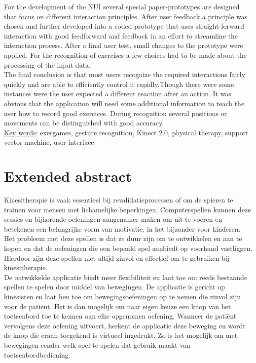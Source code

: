 For the development of the NUI several special paper-prototypes are designed that focus on different interaction principles. After user feedback a principle was chosen and further developed into a coded prototype that uses straight-forward interaction with good feedforward and feedback in an effort to streamline the interaction process. After a final user test, small changes to the prototype were applied. For the recognition of exercises a few choices had to be made about the processing of the input data.\\


The final conclusion is that most users recognize the required interactions fairly quickly and are able to efficiently control it rapidly.Though there were some instances were the user expected a different reaction after an action. It was obvious that the application will need some additional information to teach the user how to record good exercices. During recognition several positions or movements can be distinguished with good accuracy. \\


\underline{Key words}: exergames, gesture recognition, Kinect 2.0, physical therapy, support vector machine, user interface


\chapter*{Extended abstract}

Kinesitherapie is vaak essentieel bij revalidatieprocessen of om de spieren te trainen voor mensen met lichamelijke beperkingen. Computerspellen kunnen deze sessies en bijhorende oefeningen aangenamer maken om uit te voeren en betekenen een belangrijke vorm van motivatie, in het bijzonder voor kinderen. Het probleem met deze spellen is dat ze duur zijn om te ontwikkelen en aan te kopen en dat de oefeningen die een bepaald spel aanbiedt op voorhand vastliggen. Hierdoor zijn deze spellen niet altijd zinvol en effectief om te gebruiken bij kinesitherapie.\\

De ontwikkelde applicatie biedt meer flexibiliteit en laat toe om reeds bestaande spellen te spelen door middel van bewegingen. De applicatie is gericht op kinesisten en laat hen toe om bewegingsoefeningen op te nemen die zinvol zijn voor de pati\"ent. Het is dan mogelijk om naar eigen keuze een knop van het toetsenbord toe te kennen aan elke opgenomen oefening. Wanneer de pati\"ent vervolgens deze oefening uitvoert, herkent de applicatie deze beweging en wordt de knop die eraan toegekend is virtueel ingedrukt. Zo is het mogelijk om met bewegingen eender welk spel te spelen dat gebruik maakt van toetsenbordbediening.\\

